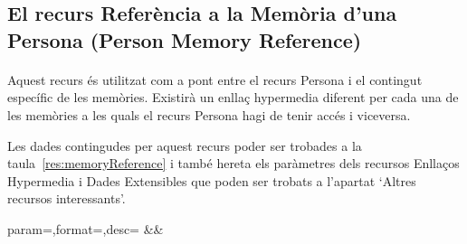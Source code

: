 \subsection{El recurs Referència a la Memòria d'una Persona (Person Memory Reference)}

    \paragraph{}
    Aquest recurs és utilitzat com a pont entre el recurs Persona i el contingut específic de les memòries. Existirà un enllaç hypermedia diferent per cada una de les memòries a les quals el recurs Persona hagi de tenir accés i viceversa.

    Les dades contingudes per aquest recurs poder ser trobades a la taula~\ref{res:memoryReference} i també hereta els paràmetres dels recursos Enllaços Hypermedia i Dades Extensibles que poden ser trobats a l'apartat `Altres recursos interessants'.

    \begin{center}
             {param=\param,format=\format,desc=\desc}
             {\param&\format&\desc}
     \end{center}
